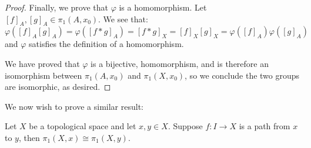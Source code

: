 \begin{proof}
	Finally, we prove that $\varphi$ is a homomorphism. Let $[f]_A,[g]_A\in \pi_1(A,x_0)$. We see that:
	\[\varphi([f]_A[g]_A) = \varphi([f*g]_A) = [f*g]_X = [f]_X [g]_X = \varphi([f]_A)\varphi([g]_A)\]
	and $\varphi$ satisfies the definition of a homomorphism.
	
	We have proved that $\varphi$ is a bijective, homomorphism, and is therefore an isomorphism between $\pi_1(A,x_0)$ and $\pi_1(X,x_0)$, so we conclude the two groups are isomorphic, as desired. 
\end{proof}

We now wish to prove a similar result: 
\begin{theorem}
	Let $X$ be a topological space and let $x,y\in X$. Suppose $f:I\to X$ is a path from $x$ to $y$, then $\pi_1(X,x)\cong \pi_1(X,y)$. 
\end{theorem}

